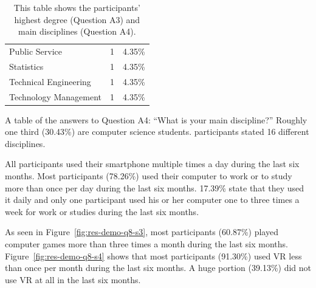 \begin{table}[H]
\begin{subtable}[b]{.48\textwidth}
\begin{tabular}[b]{l c c}
			Public Service          & 1     & 4.35\%     \\
			Statistics              & 1     & 4.35\%     \\
			Technical Engineering   & 1     & 4.35\%     \\
			Technology Management   & 1     & 4.35\%     \\
			\bottomrule
		\end{tabular}
		\caption{A table of the answers to Question A4: \enquote{What is your main discipline?} Roughly one third (30.43\%) are computer science students. \participantsCount{} participants stated 16 different disciplines.}\label{tab:sus-discipline}
	\end{subtable}
	\caption[Degree and discipline of participants]{This table shows the participants' highest degree (Question A3) and main disciplines (Question A4).}\label{tab:sus-d}
\end{table}

All participants used their smartphone multiple times a day during the last six months. Most participants (78.26\%) used their computer to work or to study more than once per day during the last six months. 17.39\% state that they used it daily and only one participant used his or her computer one to three times a week for work or studies during the last six months.

As seen in Figure~\ref{fig:res-demo-q8-s3}, most participants (60.87\%) played computer games more than three times a month during the last six months. Figure~\ref{fig:res-demo-q8-s4} shows that most participants (91.30\%) used \gls{VR} less than once per month during the last six months. A huge portion (39.13\%) did not use \gls{VR} at all in the last six months.

